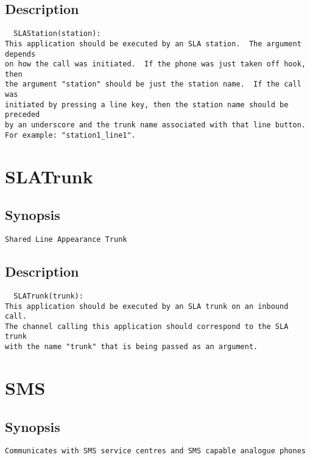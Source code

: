 \subsection{Description}
\begin{verbatim}
  SLAStation(station):
This application should be executed by an SLA station.  The argument depends
on how the call was initiated.  If the phone was just taken off hook, then
the argument "station" should be just the station name.  If the call was
initiated by pressing a line key, then the station name should be preceded
by an underscore and the trunk name associated with that line button.
For example: "station1_line1".
\end{verbatim}


\section{SLATrunk}
\subsection{Synopsis}
\begin{verbatim}
Shared Line Appearance Trunk
\end{verbatim}
\subsection{Description}
\begin{verbatim}
  SLATrunk(trunk):
This application should be executed by an SLA trunk on an inbound call.
The channel calling this application should correspond to the SLA trunk
with the name "trunk" that is being passed as an argument.

\end{verbatim}


\section{SMS}
\subsection{Synopsis}
\begin{verbatim}
Communicates with SMS service centres and SMS capable analogue phones
\end{verbatim}
